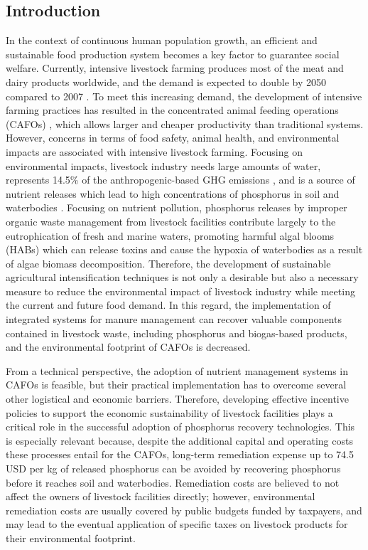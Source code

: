 \begin{refsection}[referencesCh5]
\section{Introduction}
In the context of continuous human population growth, an efficient and sustainable food production system becomes a key factor to guarantee social welfare. Currently, intensive livestock farming produces most of the meat and dairy products worldwide, and the demand is expected to double by 2050 compared to 2007 \citep{livestock_projection}. To meet this increasing demand, the development of intensive farming practices has resulted in the concentrated animal feeding operations (CAFOs) \citep{animal_unit_definition}, which allows larger and cheaper productivity than traditional systems. However, concerns in terms of food safety, animal health, and environmental impacts are associated with intensive livestock farming. Focusing on environmental impacts, livestock industry needs large amounts of water, represents 14.5\% of the anthropogenic-based GHG emissions \citep{eisler_agriculture:_2014}, and is a source of nutrient releases which lead to high concentrations of phosphorus in soil and waterbodies \citep{Sampat2017}. Focusing on nutrient pollution, phosphorus releases by improper organic waste management from livestock facilities contribute largely to the eutrophication of fresh and marine waters, promoting harmful algal blooms (HABs) which can release toxins and cause the hypoxia of waterbodies as a result of algae biomass decomposition. 
Therefore, the development of sustainable agricultural intensification techniques is not only a desirable but also a necessary measure to reduce the environmental impact of livestock industry while meeting the current and future food demand. In this regard, the implementation of integrated systems for manure management can recover valuable components contained in livestock waste, including phosphorus and biogas-based products, and the environmental footprint of CAFOs is decreased.

From a technical perspective, the adoption of nutrient management systems in CAFOs is feasible, but their practical implementation has to overcome several other logistical  and economic barriers.
Therefore, developing effective incentive policies to support the economic sustainability of livestock facilities plays a critical role in the successful adoption of phosphorus recovery technologies.
This is especially relevant because, despite the additional capital and operating costs these processes entail for the CAFOs, long-term remediation expense up to 74.5 USD per kg of released phosphorus \citep{Sampat2020} can be avoided by recovering phosphorus before it reaches soil and waterbodies. Remediation costs are believed to not affect the owners of livestock facilities directly; however, environmental remediation costs are usually covered by public budgets funded by taxpayers, and may lead to the eventual application of specific taxes on livestock products for their environmental footprint.


\end{refsection}
